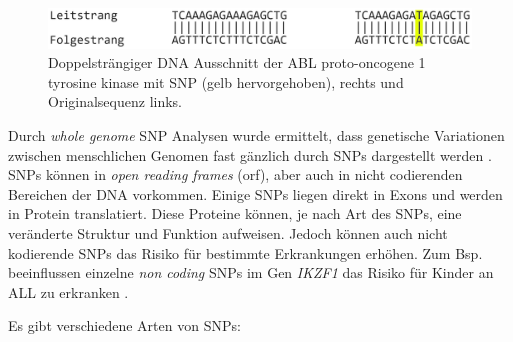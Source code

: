 \begin{figure}[H]
    \centering
    \includegraphics[width=.95\textwidth]{images/DNA_ds_strand_with_snp.png}
    \caption{Doppelsträngiger DNA Ausschnitt der ABL proto-oncogene 1 tyrosine kinase mit \ac{SNP} (gelb hervorgehoben), rechts und Originalsequenz links.}
    \label{fig:snp}
\end{figure}



Durch \emph{whole genome} \ac{SNP} Analysen wurde ermittelt, dass genetische Variationen zwischen menschlichen Genomen fast gänzlich durch \ac{SNP}s dargestellt werden \cite{Do.2015}. 
\ac{SNP}s können in \emph{open reading frames} (orf), aber auch in nicht codierenden Bereichen der DNA vorkommen. Einige \ac{SNP}s liegen direkt in Exons und werden in Protein translatiert. Diese Proteine können, je nach Art des \ac{SNP}s, eine veränderte Struktur und Funktion aufweisen. Jedoch können auch nicht kodierende \ac{SNP}s das Risiko für bestimmte Erkrankungen erhöhen. Zum Bsp. beeinflussen einzelne \emph{non coding} \ac{SNP}s im Gen \emph{IKZF1} das Risiko für Kinder an ALL zu erkranken \cite{Papaemmanuil.2009}.

Es gibt verschiedene Arten von \ac{SNP}s:

